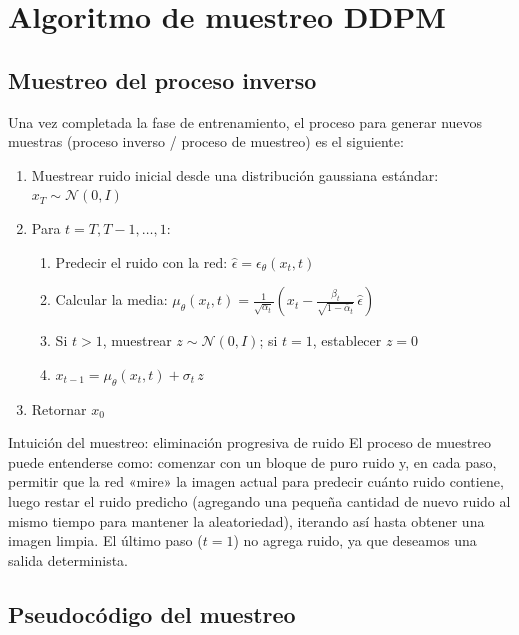 \section{Algoritmo de muestreo DDPM}

\subsection{Muestreo del proceso inverso}

Una vez completada la fase de entrenamiento, el proceso para generar nuevos muestras (proceso inverso / proceso de muestreo) es el siguiente:

\begin{enumerate}
    \item Muestrear ruido inicial desde una distribución gaussiana estándar: $x_T \sim \mathcal{N}(0, I)$
    \item Para $t = T, T-1, \dots, 1$:
    \begin{enumerate}
        \item Predecir el ruido con la red: $\hat{\epsilon} = \epsilon_\theta(x_t, t)$
        \item Calcular la media: $\mu_\theta(x_t, t) = \frac{1}{\sqrt{\alpha_t}}\left(x_t - \frac{\beta_t}{\sqrt{1-\bar{\alpha}_t}}\, \hat{\epsilon}\right)$
        \item Si $t > 1$, muestrear $z \sim \mathcal{N}(0, I)$; si $t = 1$, establecer $z = 0$
        \item $x_{t-1} = \mu_\theta(x_t, t) + \sigma_t\, z$
    \end{enumerate}
    \item Retornar $x_0$
\end{enumerate}

\begin{importantbox}{Intuición del muestreo: eliminación progresiva de ruido}
El proceso de muestreo puede entenderse como: comenzar con un bloque de puro ruido y, en cada paso, permitir que la red «mire» la imagen actual para predecir cuánto ruido contiene, luego restar el ruido predicho (agregando una pequeña cantidad de nuevo ruido al mismo tiempo para mantener la aleatoriedad), iterando así hasta obtener una imagen limpia. El último paso ($t=1$) no agrega ruido, ya que deseamos una salida determinista.
\end{importantbox}

\subsection{Pseudocódigo del muestreo}


